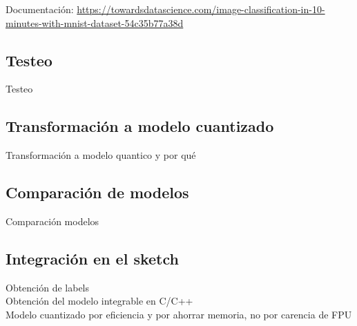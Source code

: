 Documentación:
\url{https://towardsdatascience.com/image-classification-in-10-minutes-with-mnist-dataset-54c35b77a38d}

\subsection{Testeo}
{\color{red} Testeo}\\

\subsection{Transformación a modelo cuantizado}
{\color{red} Transformación a modelo quantico y por qué}\\

\subsection{Comparación de modelos}
{\color{red} Comparación modelos}\\

\subsection{Integración en el sketch}
{\color{red} Obtención de labels}\\
{\color{red} Obtención del modelo integrable en C/C++}\\
{\color{red} Modelo cuantizado por eficiencia y por ahorrar memoria, no
por carencia de FPU}\\